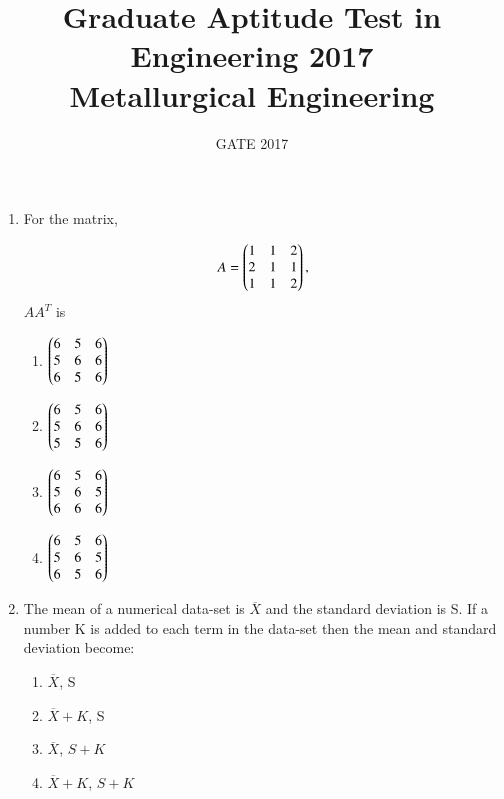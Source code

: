 \documentclass[journal]{IEEEtran}
\theoremstyle{remark}
\begin{document}

\onecolumn

\title{Graduate Aptitude Test in Engineering 2017 \\ Metallurgical Engineering}
\author{GATE 2017}
\maketitle


\renewcommand{\thefigure}{\theenumi}
\renewcommand{\thetable}{\theenumi}


\begin{enumerate}
\item For the matrix, 

\begin{align}
A= 
\begin{pmatrix}1 & 1 & 2 \\ 2 & 1 & 1 \\1 & 1 & 2\end{pmatrix} , 
\end{align}
$AA^T $ is
\hfill{}

\begin{multicols}{2}
\begin{enumerate}
    \item $\begin{pmatrix}6 & 5 & 6 \\ 5 & 6 & 6 \\6 & 5 & 6\end{pmatrix}$
    \item $\begin{pmatrix}6 & 5 & 6 \\ 5 & 6 & 6 \\5 & 5 & 6\end{pmatrix}$
    \item $\begin{pmatrix}6 & 5 & 6 \\ 5 & 6 & 5 \\6 & 6 & 6\end{pmatrix}$
    \item $\begin{pmatrix}6 & 5 & 6 \\ 5 & 6 & 5 \\6 & 5 & 6\end{pmatrix}$
\end{enumerate}
\end{multicols}

\item The mean of a numerical data-set is $\overline{X}$ and the standard deviation is S. If a number K is added to each term in the data-set then the mean and standard deviation become: \hfill{}
\begin{multicols}{2}
\begin{enumerate}
    \item $\overline{X}$, S
    \item $\overline{X}+K$, S
    \item $\overline{X}$, $S+K$
    \item $\overline{X}+K$, $S+K$
\end{enumerate}
\end{multicols}


\end{enumerate}
\end{document}
